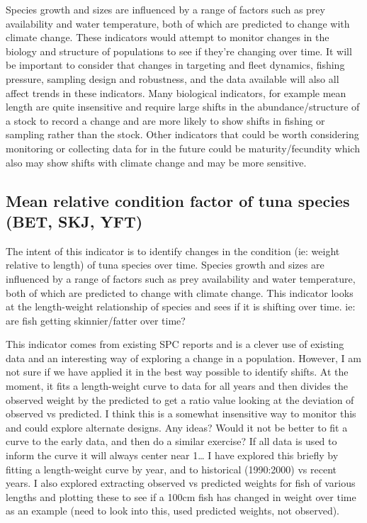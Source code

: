 \documentclass[
]{article}
\begin{document}
Species growth and sizes are influenced by a range of factors such as
prey availability and water temperature, both of which are predicted to
change with climate change. These indicators would attempt to monitor
changes in the biology and structure of populations to see if they're
changing over time. It will be important to consider that changes in
targeting and fleet dynamics, fishing pressure, sampling design and
robustness, and the data available will also all affect trends in these
indicators. Many biological indicators, for example mean length are
quite insensitive and require large shifts in the abundance/structure of
a stock to record a change and are more likely to show shifts in fishing
or sampling rather than the stock. Other indicators that could be worth
considering monitoring or collecting data for in the future could be
maturity/fecundity which also may show shifts with climate change and
may be more sensitive.

\hypertarget{mean-relative-condition-factor-of-tuna-species-bet-skj-yft}{%
\subsection{Mean relative condition factor of tuna species (BET, SKJ,
YFT)}\label{mean-relative-condition-factor-of-tuna-species-bet-skj-yft}}

The intent of this indicator is to identify changes in the condition
(ie: weight relative to length) of tuna species over time. Species
growth and sizes are influenced by a range of factors such as prey
availability and water temperature, both of which are predicted to
change with climate change. This indicator looks at the length-weight
relationship of species and sees if it is shifting over time. ie: are
fish getting skinnier/fatter over time?

This indicator comes from existing SPC reports and is a clever use of
existing data and an interesting way of exploring a change in a
population. However, I am not sure if we have applied it in the best way
possible to identify shifts. At the moment, it fits a length-weight
curve to data for all years and then divides the observed weight by the
predicted to get a ratio value looking at the deviation of observed vs
predicted. I think this is a somewhat insensitive way to monitor this
and could explore alternate designs. Any ideas? Would it not be better
to fit a curve to the early data, and then do a similar exercise? If all
data is used to inform the curve it will always center near 1\ldots{} I
have explored this briefly by fitting a length-weight curve by year, and
to historical (1990:2000) vs recent years. I also explored extracting
observed vs predicted weights for fish of various lengths and plotting
these to see if a 100cm fish has changed in weight over time as an
example (need to look into this, used predicted weights, not observed).
\end{document}
